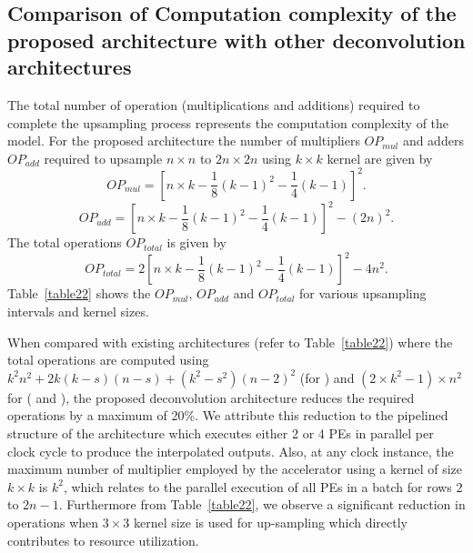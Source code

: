 \documentclass[journal]{IEEEtran}
\begin{document}
\subsection{Comparison of Computation complexity of the proposed architecture with other deconvolution architectures }\label{sec:Algorithm comparison}
The total number of operation (multiplications and additions) required to complete the upsampling process represents the computation complexity of the model. For the proposed architecture the number of multipliers $OP_{mul}$ and adders $OP_{add}$ required to upsample $n\times n$ to $2n\times2n$ using $k\times k$ kernel are given by 
\begin{equation}
OP_{mul}=[n \times k -  \frac{1}{8}(k - 1)^2 - \frac{1}{4}(k - 1)]^2.
\end{equation}
\begin{equation}
OP_{add}= [n \times k - \frac{1}{8}(k - 1)^2 - \frac{1}{4}(k - 1)]^2 - (2n)^2 .
\end{equation}
The total operations $OP_{total}$ is given by
\begin{equation}
OP_{total}=2[n \times k -  \frac{1}{8}(k - 1)^2 - \frac{1}{4}(k - 1)]^2 - 4n^2 .
\end{equation}
Table~\ref{table22} shows the $OP_{mul}$, $OP_{add}$ and $OP_{total}$ for various upsampling intervals and kernel sizes.

When compared with existing architectures (refer to Table~\ref{table22}) where the total operations are computed using $k^2n^2 + 2k(k - s)(n - s) + (k^2 - s^2)(n - 2)^2 $ (for \cite{article3}) and $(2 \times k^2 - 1) \times n^2$ for (\cite{article4} and \cite{article14}), the proposed deconvolution architecture reduces the required operations by a maximum of 20\%. We attribute this reduction to the pipelined structure of the architecture which executes either 2 or 4 PEs in parallel per clock cycle to produce the interpolated outputs. Also, at any clock instance, the maximum number of multiplier employed by the accelerator using a kernel of size $k\times k$ is $k^2$, which relates to the parallel execution of all PEs in a batch for rows $2$ to $2n-1$. Furthermore from Table~\ref{table22}, we observe a significant reduction in operations when $3 \times 3$ kernel size is used for up-sampling which directly contributes to resource utilization.
\end{document}
